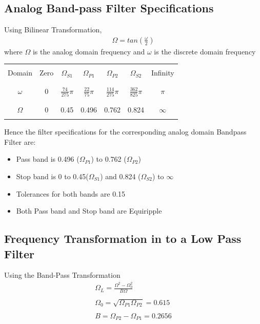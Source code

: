 \documentclass[12pt]{article}
\begin{document}
\color{cyan}
\subsection{Analog Band-pass Filter Specifications}
\color{black}
Using Bilinear Transformation,
\begin{gather*}
	\Omega = tan\left(\frac{\omega}{2}\right)
\end{gather*}
where $\Omega$ is the analog domain frequency and $\omega$ is the discrete domain frequency\\

\begin{center}
	\begin{tabular}{ |c|c|c|c|c|c|c| }
		\hline
		&&&&&&\\
		Domain& Zero & $\Omega_{S1}$ & $\Omega_{P1}$ &$\Omega_{P2}$& $\Omega_{S2}$&Infinity\\
		&&&&&&\\
		\hline
		&&&&&&\\
		$\omega$ & 0 & $\frac{74}{275}\pi$ & $\frac{22}{75}\pi$& $\frac{114}{275}\pi$& $\frac{362}{825}\pi$& $\pi$\\
		&&&&&&\\
		\hline
		&&&&&&\\
		$\Omega$ & 0 & 0.45 & 0.496 & 0.762& 0.824 & $\infty$\\
		&&&&&&\\
		\hline
	\end{tabular}
\end{center}

\noindent Hence the filter specifications for the corresponding analog domain Bandpass Filter are:
\begin{itemize}
	\item Pass band is 0.496 ($\Omega_{P1}$)  to 0.762 ($\Omega_{P2}$) 
	\item Stop band is 0 to 0.45($\Omega_{S1}$) and 0.824 ($\Omega_{S2}$) to $\infty$
	\item Tolerances for both bands are 0.15
	\item Both Pass band and Stop band are Equiripple
\end{itemize}

\color{cyan}
\subsection{Frequency Transformation in to a Low Pass Filter}
\color{black}
Using the Band-Pass Transformation
\begin{gather*}
	\Omega_L = \frac{\Omega^2 - \Omega_0^2}{B\Omega}\\\\
	\Omega_0 = \sqrt{\Omega_{P1} \Omega_{P2}} = 0.615\\\\
	B = \Omega_{P2} - \Omega_{P1} = 0.2656
\end{gather*}
\end{document}
